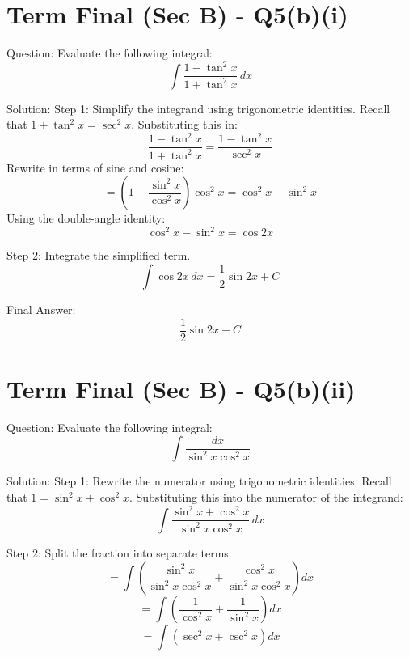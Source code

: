 \documentclass{article}
\begin{document}
\section*{Term Final (Sec B) - Q5(b)(i)}
Question:
Evaluate the following integral:
\[
\int \frac{1-\tan^2 x}{1+\tan^2 x} \, dx
\]

Solution:
Step 1: Simplify the integrand using trigonometric identities.
Recall that $1 + \tan^2 x = \sec^2 x$.
Substituting this in:
\[
\frac{1-\tan^2 x}{1+\tan^2 x} = \frac{1-\tan^2 x}{\sec^2 x}
\]
Rewrite in terms of sine and cosine:
\[
= \left(1 - \frac{\sin^2 x}{\cos^2 x}\right) \cos^2 x = \cos^2 x - \sin^2 x
\]
Using the double-angle identity:
\[
\cos^2 x - \sin^2 x = \cos 2x
\]

Step 2: Integrate the simplified term.
\[
\int \cos 2x \, dx = \frac{1}{2} \sin 2x + C
\]

Final Answer:
\[
\boxed{\frac{1}{2} \sin 2x + C}
\]

\section*{Term Final (Sec B) - Q5(b)(ii)}
Question:
Evaluate the following integral:
\[
\int \frac{dx}{\sin^2 x \cos^2 x}
\]

Solution:
Step 1: Rewrite the numerator using trigonometric identities.
Recall that $1 = \sin^2 x + \cos^2 x$.
Substituting this into the numerator of the integrand:
\[
\int \frac{\sin^2 x + \cos^2 x}{\sin^2 x \cos^2 x} \, dx
\]

Step 2: Split the fraction into separate terms.
\[
= \int \left( \frac{\sin^2 x}{\sin^2 x \cos^2 x} + \frac{\cos^2 x}{\sin^2 x \cos^2 x} \right) dx
\]
\[
= \int \left( \frac{1}{\cos^2 x} + \frac{1}{\sin^2 x} \right) dx
\]
\[
= \int \left( \sec^2 x + \csc^2 x \right) dx
\]
\end{document}
